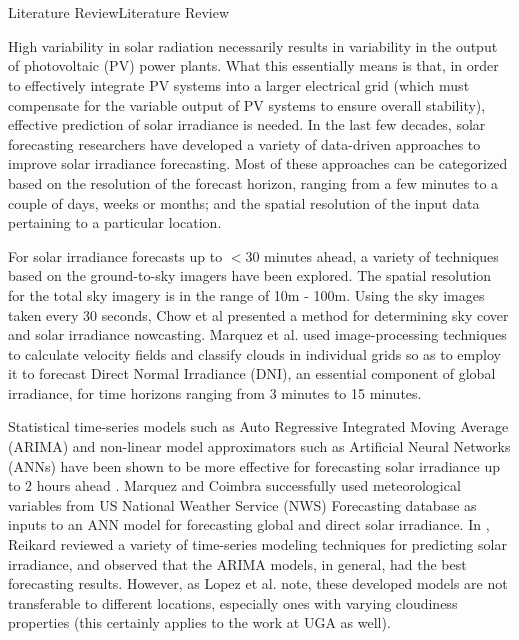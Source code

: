 \chapter{}{Literature Review}{Literature Review}
\par High variability in solar radiation necessarily results in variability in the output of photovoltaic (PV) power plants. What this essentially means is that, in order to effectively integrate PV systems into a larger electrical grid (which must compensate for the variable output of PV systems to ensure overall stability), effective prediction of solar irradiance is needed. In the last few decades, solar forecasting researchers have developed a variety of data-driven approaches to improve solar irradiance forecasting. Most of these approaches can be categorized based on the resolution of the forecast horizon, ranging from a few minutes to a couple of days, weeks or months; and the spatial resolution of the input data pertaining to a particular location. 

\par For solar irradiance forecasts up to $<30$ minutes ahead, a variety of techniques based on the ground-to-sky imagers have been explored. The spatial resolution for the total sky imagery is in the range of 10m - 100m. Using the sky images taken every 30 seconds, Chow et al \cite{litrev_intrahour1} presented a method for determining sky cover and solar irradiance nowcasting. Marquez et al. \cite{litrev_intrahour2} used image-processing techniques to calculate velocity fields and classify clouds in individual grids so as to employ it to forecast Direct Normal Irradiance (DNI), an essential component of global irradiance, for time horizons ranging from 3 minutes to 15 minutes.

\par Statistical time-series models such as Auto Regressive Integrated Moving Average (ARIMA) and non-linear model approximators such as Artificial Neural Networks (ANNs) have been shown to be more effective for forecasting solar irradiance up to $2$ hours ahead \cite{litrev_ts1}. Marquez and Coimbra \cite{litrev_ts2} successfully used meteorological variables from US National Weather Service (NWS) Forecasting database as inputs to an ANN model for forecasting global and direct solar irradiance. In \cite{litrev_ts3}, Reikard reviewed a variety of time-series modeling techniques for predicting solar irradiance, and observed that the ARIMA models, in general, had the best forecasting results. However, as Lopez et al. \cite{litrev_ts4} note, these developed models are not transferable to different locations, especially ones with varying cloudiness properties (this certainly applies to the work at UGA as well).

